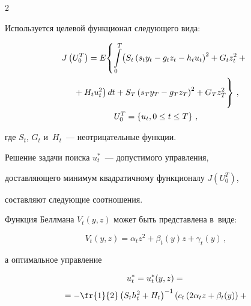 \begin{multicols}{2}
     


     Используется целевой функционал следующего вида:


     \begin{multline*}


     \!J\left( U_0^T\right) =E\!\left\{ \int\limits_0^T\!\big( S_t\left( s_t y_t -g_t z_t-h_t 


u_t\right)^2+G_t z_t^2+{}\right.\\


\left.{}+H_t u_t^2\big)\,dt+


 S_T\left( s_T y_T-g_T z_T\right)^2+G_T z_T^2


      \vphantom{\int\limits_0^T}\right\}\,,\\


     U_0^T=\left\{ u_t, 0\leq t\leq T


     \right\}\,,




     \end{multline*}


где $S_t$, $G_t$ и~$H_t$~--- неотрицательные функции.





     Решение задачи поиска $u_t^*$~--- допустимого управ\-ле\-ния, 


доставляющего минимум квадратичному функционалу $J(U_0^T)$, 


составляют следующие соотношения.


     


     Функция Беллмана $V_t(y,z)$ может быть пред\-став\-ле\-на в~виде:


     \begin{equation*}


     V_t(y,z)=\alpha_t z^2+\beta_t(y) z+\gamma_t(y)\,,




     \end{equation*}


а оптимальное управление


\begin{multline}


u_t^* =u_t^*(y,z)={}\\[2pt]


{}=-\fr{1}{2}\left( S_th_t^2+H_t\right)^{-1}\left( c_t \left(


2\alpha_t z+\beta_t(y)\right)+{}\right.\\[2pt]



\end{multline}
\end{multicols}
